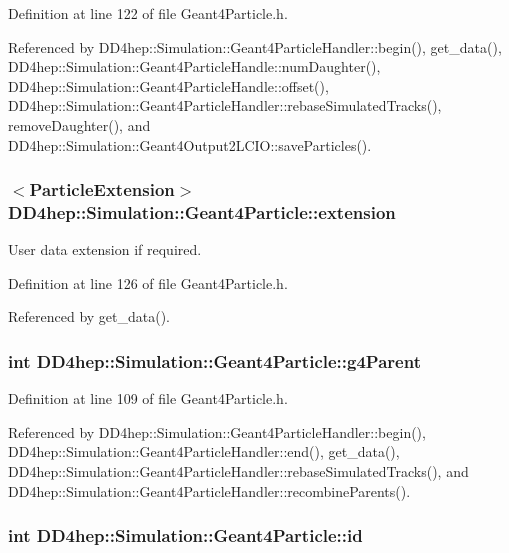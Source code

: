 Definition at line 122 of file Geant4Particle.h.

Referenced by DD4hep::Simulation::Geant4ParticleHandler::begin(), get\_\-data(), DD4hep::Simulation::Geant4ParticleHandle::numDaughter(), DD4hep::Simulation::Geant4ParticleHandle::offset(), DD4hep::Simulation::Geant4ParticleHandler::rebaseSimulatedTracks(), removeDaughter(), and DD4hep::Simulation::Geant4Output2LCIO::saveParticles().\hypertarget{class_d_d4hep_1_1_simulation_1_1_geant4_particle_a07c7467088b330c17ad7f85374273470}{
\subsubsection[{extension}]{$<${\bf ParticleExtension}$>$ {\bf DD4hep::Simulation::Geant4Particle::extension}}}
\label{class_d_d4hep_1_1_simulation_1_1_geant4_particle_a07c7467088b330c17ad7f85374273470}


User data extension if required. 

Definition at line 126 of file Geant4Particle.h.

Referenced by get\_\-data().\hypertarget{class_d_d4hep_1_1_simulation_1_1_geant4_particle_a0a8fe0ae8782e18a88f1dd44556de52b}{
\subsubsection[{g4Parent}]{\setlength{\rightskip}{0pt plus 5cm}int {\bf DD4hep::Simulation::Geant4Particle::g4Parent}}}
\label{class_d_d4hep_1_1_simulation_1_1_geant4_particle_a0a8fe0ae8782e18a88f1dd44556de52b}


Definition at line 109 of file Geant4Particle.h.

Referenced by DD4hep::Simulation::Geant4ParticleHandler::begin(), DD4hep::Simulation::Geant4ParticleHandler::end(), get\_\-data(), DD4hep::Simulation::Geant4ParticleHandler::rebaseSimulatedTracks(), and DD4hep::Simulation::Geant4ParticleHandler::recombineParents().\hypertarget{class_d_d4hep_1_1_simulation_1_1_geant4_particle_acc6eea6683706e87e8b769c94caf3cd2}{
\subsubsection[{id}]{\setlength{\rightskip}{0pt plus 5cm}int {\bf DD4hep::Simulation::Geant4Particle::id}}}
\label{class_d_d4hep_1_1_simulation_1_1_geant4_particle_acc6eea6683706e87e8b769c94caf3cd2}


